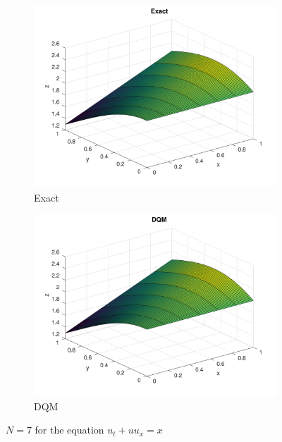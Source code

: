 \begin{solution}
\begin{english}
	\begin{figure}[ht]
		\centering
		\begin{subfigure}{0.3\textwidth}
			\includegraphics[scale=0.05]{Figures/secondExactN7}
			\caption{Exact}
		\end{subfigure}
		\qquad \begin{subfigure}{0.3\textwidth}
			\includegraphics[scale=0.05]{Figures/secondN7}
			\caption{DQM}
		\end{subfigure}
		\caption{$N=7$ for the equation $u_t + u u_x = x$}
		\label{fig:secondexampleN7}
	\end{figure}
\end{english}
\end{solution}